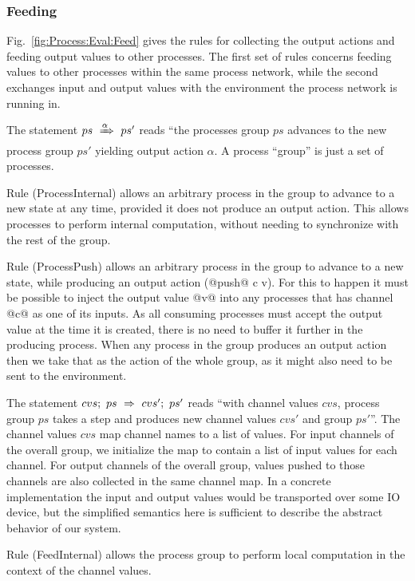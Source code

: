 \subsubsection{Feeding}
Fig.~\ref{fig:Process:Eval:Feed} gives the rules for collecting the output actions and feeding output values to other processes. The first set of rules concerns feeding values to other processes within the same process network, while the second exchanges input and output values with the environment the process network is running in.

\eject{}
The statement $ps~\xRightarrow{\alpha}~ps'$ reads ``the processes group $ps$ advances to the new process group $ps'$ yielding output action $\alpha$. A process ``group'' is just a set of processes. 

Rule (ProcessInternal) allows an arbitrary process in the group to advance to a new state at any time, provided it does not produce an output action. This allows processes to perform internal computation, without needing to synchronize with the rest of the group.

Rule (ProcessPush) allows an arbitrary process in the group to advance to a new state, while producing an output action (@push@ c v). For this to happen it must be possible to inject the output value @v@ into any processes that has channel @c@ as one of its inputs. As all consuming processes must accept the output value at the time it is created, there is no need to buffer it further in the producing process. When any process in the group produces an output action then we take that as the action of the whole group, as it might also need to be sent to the environment. 

\smallskip
The statement $cvs;~ps~\Rightarrow~cvs';~ps'$ reads ``with channel values $cvs$, process group $ps$ takes a step and produces new channel values $cvs'$ and group $ps'$''. The channel values $cvs$ map channel names to a list of values. For input channels of the overall group, we initialize the map to contain a list of input values for each channel. For output channels of the overall group, values pushed to those channels are also collected in the same channel map. In a concrete implementation the input and output values would be transported over some IO device, but the simplified semantics here is sufficient to describe the abstract behavior of our system.

Rule (FeedInternal) allows the process group to perform local computation in the context of the channel values. 

